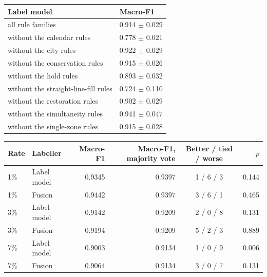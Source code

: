 \documentclass[11pt,a4paper]{article}
\makeatletter
\newenvironment{stable}{\par\addvspace{8pt}\noindent\begin{minipage}{\textwidth}\def\@captype{table}\centering}{\end{minipage}\par\addvspace{8pt}}
\makeatother
\begin{document}
\begin{stable}
\caption{The label model refitted without one rule family at a time, on the typed injected events detected by the full method (3\%, test period, mean $\pm$ s.d. over the 10 test seeds).}\label{tab:s-families}
\footnotesize\setlength{\tabcolsep}{4pt}
\begin{tabular}{@{}l l@{}}
\toprule
Label model & Macro-F1 \\
\midrule
all rule families & 0.914 $\pm$ 0.029 \\
without the calendar rules & 0.778 $\pm$ 0.021 \\
without the city rules & 0.922 $\pm$ 0.029 \\
without the conservation rules & 0.915 $\pm$ 0.026 \\
without the hold rules & 0.893 $\pm$ 0.032 \\
without the straight-line-fill rules & 0.724 $\pm$ 0.110 \\
without the restoration rules & 0.902 $\pm$ 0.029 \\
without the simultaneity rules & 0.941 $\pm$ 0.047 \\
without the single-zone rules & 0.915 $\pm$ 0.028 \\
\bottomrule
\end{tabular}
\end{stable}

\begin{stable}
\caption{Attribution against the rules' majority vote (the tests behind Table~7 of the article): macro-F1 on the typed injected events detected by the full method (test period, mean over the 10 test seeds), the seeds in which the labeller is better, tied or worse, and the paired Wilcoxon $p$. Fusion weight $\beta$ tuned on the earlier period: 0.7, 0.6, 0.6 at 1, 3 and 7\%; the end model abstains on classes with fewer than 3 training items.}\label{tab:s-attribution-tests}
\footnotesize\setlength{\tabcolsep}{4pt}
\begin{tabular}{@{}l l r r c r@{}}
\toprule
Rate & Labeller & Macro-F1 & Macro-F1, majority vote & Better / tied / worse & $p$ \\
\midrule
1\% & Label model & 0.9345 & 0.9397 & 1 / 6 / 3 & 0.144 \\
1\% & Fusion & 0.9442 & 0.9397 & 3 / 6 / 1 & 0.465 \\
3\% & Label model & 0.9142 & 0.9209 & 2 / 0 / 8 & 0.131 \\
3\% & Fusion & 0.9194 & 0.9209 & 5 / 2 / 3 & 0.889 \\
7\% & Label model & 0.9003 & 0.9134 & 1 / 0 / 9 & 0.006 \\
7\% & Fusion & 0.9064 & 0.9134 & 3 / 0 / 7 & 0.131 \\
\bottomrule
\end{tabular}
\end{stable}
\end{document}
